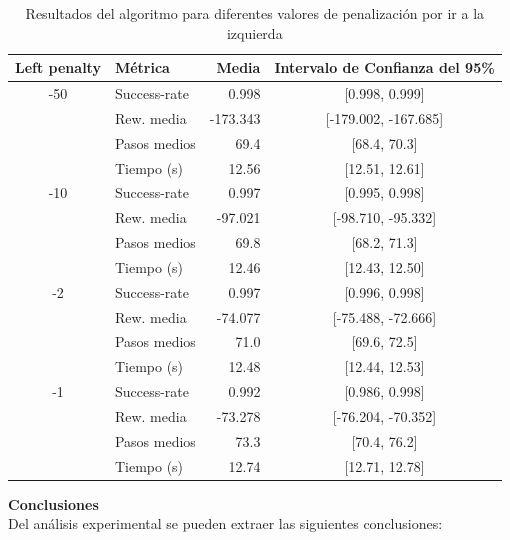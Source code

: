\begin{table}[H]
    \centering
    \begin{tabular}{|c|l|r|c|}
    \hline
    Left penalty & Métrica        & Media    & Intervalo de Confianza del 95\% \\
    \hline
    -50  & Success-rate  & 0.998     & [0.998, 0.999] \\
         & Rew. media    & -173.343  & [-179.002, -167.685] \\
         & Pasos medios  & 69.4      & [68.4, 70.3] \\
         & Tiempo (s)    & 12.56     & [12.51, 12.61] \\
    \hline
    -10  & Success-rate  & 0.997     & [0.995, 0.998] \\
         & Rew. media    & -97.021   & [-98.710, -95.332] \\
         & Pasos medios  & 69.8      & [68.2, 71.3] \\
         & Tiempo (s)    & 12.46     & [12.43, 12.50] \\
    \hline
    -2   & Success-rate  & 0.997     & [0.996, 0.998] \\
         & Rew. media    & -74.077   & [-75.488, -72.666] \\
         & Pasos medios  & 71.0      & [69.6, 72.5] \\
         & Tiempo (s)    & 12.48     & [12.44, 12.53] \\
    \hline
    -1   & Success-rate  & 0.992     & [0.986, 0.998] \\
         & Rew. media    & -73.278   & [-76.204, -70.352] \\
         & Pasos medios  & 73.3      & [70.4, 76.2] \\
         & Tiempo (s)    & 12.74     & [12.71, 12.78] \\
    \hline
    \end{tabular}
    \caption{Resultados del algoritmo para diferentes valores de penalización por ir a la izquierda}
    \label{tab:qlearning_penalizaciones}
    \end{table}
    

\textbf{Conclusiones}
\\

Del análisis experimental se pueden extraer las siguientes conclusiones:

